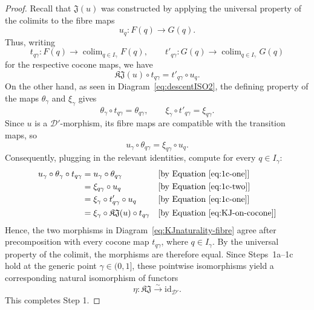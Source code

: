 \documentclass[a4paper, 11pt,reqno]{amsart}
\newcommand{\id}{\mathrm{id}}
\newcommand{\D}{\mathcal{D}}
\newcommand{\J}{\mathfrak{J}}
\newcommand{\K}{\mathfrak{K}}
\DeclareMathOperator*{\colim}{colim}
\begin{document}
\begin{proof}
Recall that $\J(u)$ was constructed by applying the universal property
of the colimits to the fibre maps
\[
u_q\colon F(q)\longrightarrow G(q).
\]
Thus, writing
\[
t_{q\gamma}\colon F(q)\longrightarrow
\colim_{q\in I_\gamma}F(q),
\qquad
t'_{q\gamma}\colon G(q)\longrightarrow
\colim_{q\in I_\gamma}G(q)
\]
for the respective cocone maps, we have
\begin{equation}\label{eq:KJ-on-cocone}
\K\J(u)\circ t_{q\gamma}
=
t'_{q\gamma}\circ u_q.
\end{equation}
On the other hand, as seen in Diagram~\eqref{eq:descentISO2}, the defining property of the maps
$\theta_\gamma$ and $\xi_\gamma$ gives
\begin{equation}\label{eq:1c-one}
\theta_\gamma\circ t_{q\gamma}=\theta_{q\gamma},
\qquad
\xi_\gamma\circ t'_{q\gamma}=\xi_{q\gamma}.
\end{equation}
Since $u$ is a $\D'$-morphism, its fibre maps are compatible with the
transition maps, so
\begin{equation}\label{eq:1c-two}
u_\gamma\circ\theta_{q\gamma}
=
\xi_{q\gamma}\circ u_q.
\end{equation}
Consequently, plugging in the relevant identities, compute for every $q\in I_\gamma$:
\begin{align*}
u_{\gamma}\circ \theta_\gamma\circ t_{q\gamma}&= u_{\gamma}\circ \theta_{q\gamma} && \text{[by Equation~\eqref{eq:1c-one}]} \\
&= \xi_{q\gamma}\circ u_q && \text{[by Equation~\eqref{eq:1c-two}]} \\
&=\xi_{\gamma}\circ t'_{q\gamma}\circ u_q && \text{[by Equation~\eqref{eq:1c-one}]}\\
&= \xi_{\gamma}\circ \K\J(u)\circ t_{q\gamma} && \text{[by Equation~\eqref{eq:KJ-on-cocone}]}
\end{align*}
Hence, the two morphisms in Diagram~\eqref{eq:KJnaturality-fibre}
agree after precomposition with every cocone map $t_{q\gamma}$, where
$q\in I_\gamma$. By the universal property of the colimit, the
morphisms are therefore equal. Since Steps~1a--1c hold at the generic
point $\gamma\in(0,1]$, these pointwise isomorphisms yield a corresponding natural isomorphism of functors 
\[
\eta\colon\K\J\xrightarrow{\sim}\id_{\D'}.
\]
This completes Step 1.
	

\end{proof}
\end{document}
